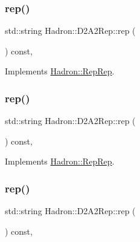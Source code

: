 \subsubsection{\texorpdfstring{rep()}{rep()}\hspace{0.1cm}{\footnotesize\ttfamily [3/5]}}
{\footnotesize\ttfamily std\+::string Hadron\+::\+D2\+A2\+Rep\+::rep (\begin{DoxyParamCaption}{ }\end{DoxyParamCaption}) const\hspace{0.3cm}{\ttfamily [inline]}, {\ttfamily [virtual]}}



Implements \mbox{\hyperlink{structHadron_1_1RepRep_ab3213025f6de249f7095892109575fde}{Hadron\+::\+Rep\+Rep}}.

\mbox{\label{structHadron_1_1D2A2Rep_a6820f2acd27e1e6bcebbe430421b0e65}} 
\subsubsection{\texorpdfstring{rep()}{rep()}\hspace{0.1cm}{\footnotesize\ttfamily [4/5]}}
{\footnotesize\ttfamily std\+::string Hadron\+::\+D2\+A2\+Rep\+::rep (\begin{DoxyParamCaption}{ }\end{DoxyParamCaption}) const\hspace{0.3cm}{\ttfamily [inline]}, {\ttfamily [virtual]}}



Implements \mbox{\hyperlink{structHadron_1_1RepRep_ab3213025f6de249f7095892109575fde}{Hadron\+::\+Rep\+Rep}}.

\mbox{\label{structHadron_1_1D2A2Rep_a6820f2acd27e1e6bcebbe430421b0e65}} 
\subsubsection{\texorpdfstring{rep()}{rep()}\hspace{0.1cm}{\footnotesize\ttfamily [5/5]}}
{\footnotesize\ttfamily std\+::string Hadron\+::\+D2\+A2\+Rep\+::rep (\begin{DoxyParamCaption}{ }\end{DoxyParamCaption}) const\hspace{0.3cm}{\ttfamily [inline]}, {\ttfamily [virtual]}}




